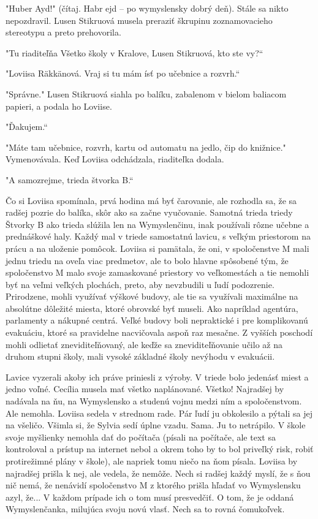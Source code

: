 \documentclass{book}
\begin{document}
"$ $Huber Ayd!"$ $ (čítaj. Habr ejd – po wymyslensky dobrý deň). Stále sa nikto nepozdravil. Lusen Stikruová musela preraziť škrupinu zoznamovacieho stereotypu a preto prehovorila.

"$ $Tu riaditeľňa Všetko školy v Kralove, Lusen Stikruová, kto ste vy?“

"$ $Loviisa Räkkänová. Vraj si tu mám ísť po učebnice a rozvrh.“

"$ $Správne."$ $ Lusen Stikruová siahla po balíku, zabalenom v bielom baliacom papieri, a podala ho Loviise.

"$ $Ďakujem.“

"$ $Máte tam učebnice, rozvrh, kartu od automatu na jedlo, čip do knižnice."$ $ Vymenovávala. Keď Loviisa odchádzala, riaditeľka dodala.

"$ $A samozrejme, trieda štvorka B.“

Čo si Loviisa spomínala, prvá hodina má byť čarovanie, ale rozhodla sa, že sa radšej pozrie do balíka, skôr ako sa začne vyučovanie. Samotná trieda triedy Štvorky B ako trieda slúžila len na Wymyslenčinu, inak používali rôzne učebne a prednáškové haly. Každý mal v triede samostatnú lavicu, s veľkým priestorom na prácu a na uloženie pomôcok. Loviisa si pamätala, že oni, v spoločenstve M mali jednu triedu na oveľa viac predmetov, ale to bolo hlavne spôsobené tým, že spoločenstvo M malo svoje zamaskované priestory vo veľkomestách a tie nemohli byť na veľmi veľkých plochách, preto, aby nevzbudili u ľudí podozrenie. Prirodzene, mohli využívať výškové budovy, ale tie sa využívali maximálne na absolútne dôležité miesta, ktoré obrovské byť museli. Ako napríklad agentúra, parlamenty a nákupné centrá. Veľké budovy boli nepraktické i pre komplikovanú evakuáciu, ktoré sa pravidelne nacvičovala aspoň raz mesačne. Z vyšších poschodí mohli odlietať zneviditeľňovaný, ale keďže sa zneviditeľňovanie učilo až na druhom stupni školy, mali vysoké základné školy nevýhodu v evakuácii.

Lavice vyzerali akoby ich práve priniesli z výroby. V triede bolo jedenásť miest a jedno voľné. Cecília musela mať všetko naplánované. Všetko! Najradšej by nadávala na ňu, na Wymyslensko a studenú vojnu medzi ním a spoločenstvom. Ale nemohla. Loviisa sedela v strednom rade. Pár ľudí ju obkolesilo a pýtali sa jej na všeličo. Všimla si, že Sylvia sedí úplne vzadu. Sama. Ju to netrápilo. V škole svoje myšlienky nemohla dať do počítača (písali na počítače, ale text sa kontroloval a prístup na internet nebol a okrem toho by to bol priveľký risk, robiť protirežimné plány v škole), ale napriek tomu niečo na ňom písala. Loviisa by najradšej prišla k nej, ale vedela, že nemôže. Nech si radšej každý myslí, že s ňou nič nemá, že nenávidí spoločenstvo M z ktorého prišla hľadať vo Wymyslensku azyl, že... V každom prípade ich o tom musí presvedčiť. O tom, že je oddaná Wymyslenčanka, milujúca svoju novú vlasť. Nech sa to rovná čomukoľvek.
\end{document}
